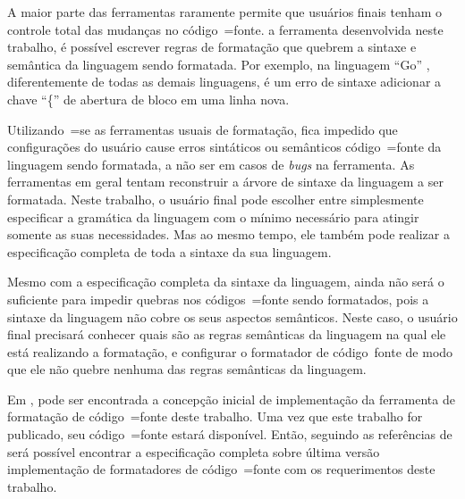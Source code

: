 {    A maior parte das ferramentas raramente permite que usuários finais tenham o controle total das mudanças no código~=fonte.
     a ferramenta desenvolvida neste trabalho,
    é possível escrever regras de formatação que quebrem a sintaxe e
    semântica da linguagem sendo formatada.
    Por exemplo,
    na linguagem ``Go'' \cite{programmingLanguageGolang},
    diferentemente de todas as demais linguagens,
    é um erro de sintaxe adicionar a chave ``\{'' de abertura de bloco em uma linha nova.

    Utilizando~=se as ferramentas usuais de formatação,
    fica impedido que configurações do usuário cause erros sintáticos ou semânticos código~=fonte da linguagem sendo formatada,
    a não ser em casos de \textit{bugs} na ferramenta.
    As ferramentas em geral tentam reconstruir a árvore de sintaxe da linguagem a ser formatada.
    Neste trabalho,
    o usuário final pode escolher entre simplesmente especificar a gramática da linguagem com o mínimo necessário para atingir somente as suas necessidades.
    Mas ao mesmo tempo,
    ele também pode realizar a especificação completa de toda a sintaxe da sua linguagem.

    Mesmo com a especificação completa da sintaxe da linguagem,
    ainda não será o suficiente para impedir quebras nos códigos~=fonte sendo formatados,
    pois a sintaxe da linguagem não cobre os seus aspectos semânticos.
    Neste caso,
    o usuário final precisará conhecer quais são as regras semânticas da linguagem na qual ele está realizando a formatação,
    e configurar o formatador de código~fonte de modo que ele não quebre nenhuma das regras semânticas da linguagem.
}

Em ,
pode ser encontrada a concepção inicial de implementação da ferramenta de formatação de código~=fonte deste trabalho.
Uma vez que este trabalho for publicado,
seu código~=fonte estará disponível.
Então,
seguindo as referências de  será possível encontrar a especificação completa sobre última versão implementação de formatadores de código~=fonte com os requerimentos deste trabalho.


\section{}

